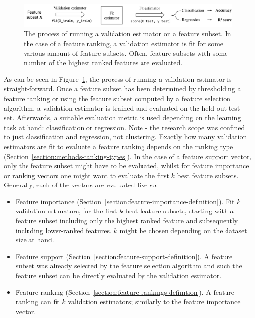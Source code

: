 \documentclass[../main.tex]{subfiles}
\begin{document}
\begin{figure}[ht]
    \centering
    \includegraphics[width=\linewidth]{report/images/schematic-validation-estimators.pdf}
    \caption{The process of running a validation estimator on a feature subset. In the case of a feature ranking, a validation estimator is fit for some various amount of feature subsets. Often, feature subsets with some number of the highest ranked features are evaluated.}
    \label{fig:schematic-validation-estimators}
\end{figure}

As can be seen in Figure~\ref{fig:schematic-validation-estimators}, the process of running a validation estimator is straight-forward. Once a feature subset has been determined by thresholding a feature ranking or using the feature subset computed by a feature selection algorithm, a validation estimator is trained and evaluated on the held-out test set. Afterwards, a suitable evaluation metric is used depending on the learning task at hand: classification or regression. Note - the \hyperref[section:introduction]{research scope} was confined to just classification and regression, not clustering. Exactly how many validation estimators are fit to evaluate a feature ranking depends on the ranking type (Section~\ref{section:methods-ranking-types}). In the case of a feature support vector, only the feature subset might have to be evaluated, whilst for feature importance or ranking vectors one might want to evaluate the first $k$ best feature subsets. Generally, each of the vectors are evaluated like so:

\begin{itemize}
    \item Feature importance (Section~\ref{section:feature-importance-definition}). Fit $k$ validation estimators, for the first $k$ best feature subsets, starting with a feature subset including only the highest ranked feature and subsequently including lower-ranked features. $k$ might be chosen depending on the dataset size at hand.
    \item Feature support (Section~\ref{section:feature-support-definition}). A feature subset was already selected by the feature selection algorithm and such the feature subset can be directly evaluated by the validation estimator.
    \item Feature ranking (Section~\ref{section:feature-rankings-definition}). A feature ranking can fit $k$ validation estimators; similarly to the feature importance vector.
\end{itemize}
\end{document}
